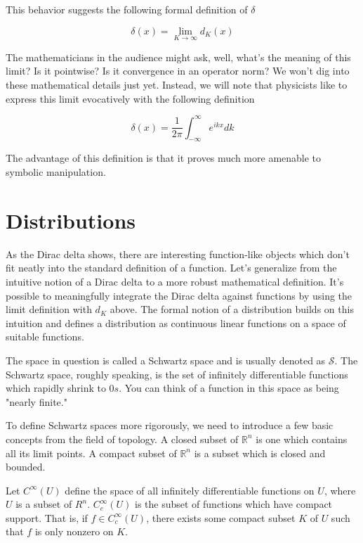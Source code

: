 \documentclass[book.tex]{subfiles}
\begin{document}


This behavior suggests the following formal definition of $\delta$

\begin{equation}
    \delta(x) = \lim_{K \to \infty} d_K(x)
\end{equation}

The mathematicians in the audience might ask, well, what's the meaning of this limit? Is it pointwise? Is it convergence in an operator norm? We won't dig into these mathematical details just yet. Instead, we will note that physicists like to express this limit evocatively with the following definition

\[ \delta(x) = \frac{1}{2\pi} \int_{-\infty}^{\infty} e^{ikx} dk \]

The advantage of this definition is that it proves much more amenable to symbolic manipulation.

\section{Distributions}

As the Dirac delta shows, there are interesting function-like objects which don't fit neatly into the standard definition of a function. Let's generalize from the intuitive notion of a Dirac delta to a more robust mathematical definition. It's possible to meaningfully integrate the Dirac delta against functions by using the limit definition with $d_K$ above. The formal notion of a distribution builds on this intuition and defines a distribution as continuous linear functions on a space of suitable functions. 

The space in question is called a Schwartz space and is usually denoted as $\mathcal{S}$. The Schwartz space, roughly speaking, is the set of infinitely differentiable functions which rapidly shrink to $0s$. You can think of a function in this space as being "nearly finite."

To define Schwartz spaces more rigorously, we need to introduce a few basic concepts from the field of topology. A closed subset of $\mathbb{R}^n$ is one which contains all its limit points. A compact subset of $\mathbb{R}^n$ is a subset which is closed and bounded.

Let $C^{\infty}(U)$ define the space of all infinitely differentiable functions on $U$, where $U$ is a subset of $R^n$. $C^{\infty}_c(U)$ is the subset of functions which have compact support. That is, if $f \in C^{\infty}_c(U)$, there exists some compact subset $K$ of $U$ such that $f$ is only nonzero on $K$.
\end{document}
